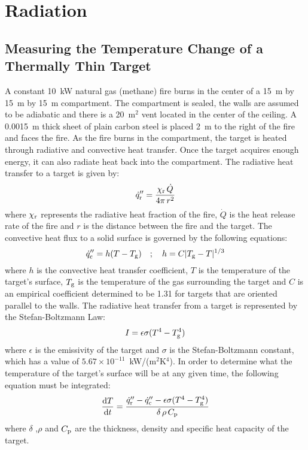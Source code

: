 \section{Radiation}

\subsection{Measuring the Temperature Change of a Thermally Thin Target}

A constant 10~kW natural gas (methane) fire burns in the center of a 15~m by 15~m by 15~m compartment. The compartment is sealed, the walls are assumed to be adiabatic and there is a 20~m$^2$ vent located in the center of the ceiling. A 0.0015~m thick sheet of plain carbon steel is placed 2~m to the right of the fire and faces the fire. As the fire burns in the compartment, the target is heated through radiative and convective heat transfer. Once the target acquires enough energy, it can also radiate heat back into the compartment. The radiative heat transfer to a target is given by:
\begin{equation}
\dot{q}_{\rm r}'' = \frac{\chi_{\rm r} \, \dot{Q}}{4\pi \, r^2}
\end{equation}
where $\chi_{\rm r}$ represents the radiative heat fraction of the fire, $\dot{Q}$ is the heat release rate of the fire and $r$ is the distance between the fire and the target.
The convective heat flux to a solid surface is governed by the following equations:
\begin{equation}
\dot{q}_{\rm c}'' = h(T-T_{\rm g}) \quad ; \quad h = C|T_{\rm g} - T|^{1/3}
\end{equation}
where $h$ is the convective heat transfer coefficient, $T$ is the temperature of the target's surface, $T_{\rm g}$ is the temperature of the gas surrounding the target and $C$ is an empirical coefficient determined to be 1.31 for targets that are oriented parallel to the walls.
The radiative heat transfer from a target is represented by the Stefan-Boltzmann Law:
 \begin{equation}
 I = \epsilon \sigma (T^4 - T_{\rm g}^4)
 \end{equation}
where $\epsilon$ is the emissivity of the target and $\sigma$ is the Stefan-Boltzmann constant, which has a value of $5.67 \times 10^{-11}$~kW/(m$^2$K$^4$).
In order to determine what the temperature of the target's surface will be at any given time, the following equation must be integrated:
\begin{equation}
 \frac{{\rm d} T}{{\rm d} t} = \frac{\dot{q}_{\rm r}'' - \dot{q}_{\rm c}'' - \epsilon \sigma (T^4 - T_{\rm g}^4) }{\delta \, \rho \, C_{\rm p}}
\end{equation}
where $\delta$ ,$\rho$ and $C_{\rm p}$ are the thickness, density and specific heat capacity of the target.


